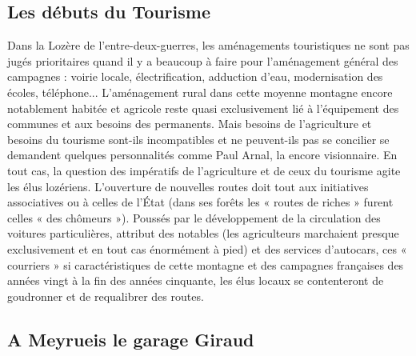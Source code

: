 

\subsection{Les débuts du Tourisme}

Dans la Lozère de l’entre-deux-guerres, les aménagements touristiques ne sont pas jugés
prioritaires quand il y a beaucoup à faire pour l’aménagement général des campagnes : voirie
locale, électrification, adduction d’eau, modernisation des écoles, téléphone... L’aménagement
rural dans cette moyenne montagne encore notablement habitée et agricole reste quasi
exclusivement lié à l’équipement des communes et aux besoins des permanents. Mais besoins de
l’agriculture et besoins du tourisme sont-ils incompatibles et ne peuvent-ils pas se concilier se
demandent quelques personnalités comme Paul Arnal, la encore visionnaire.
En tout cas, la question des impératifs de l’agriculture et de ceux du tourisme agite les élus
lozériens. L’ouverture de nouvelles routes doit tout aux initiatives associatives ou à celles de
l’État (dans ses forêts les « routes de riches » furent celles « des chômeurs »). Poussés par le
développement de la circulation des voitures particulières, attribut des notables (les agriculteurs
marchaient presque exclusivement et en tout cas énormément à pied) et des services
d’autocars, ces « courriers » si caractéristiques de cette montagne et des campagnes françaises
des années vingt à la fin des années cinquante, les élus locaux se contenteront de goudronner et
de requalibrer des routes.

\subsection{A Meyrueis le garage Giraud}

